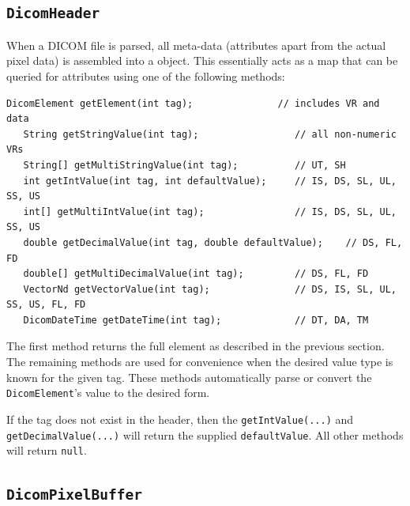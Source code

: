 \subsection{\texttt{DicomHeader}}

When a DICOM file is parsed, all meta-data (attributes apart from the actual pixel data) 
is assembled into a  object.  This essentially acts
as a map that can be queried for attributes using one of the following methods:
\begin{lstlisting}[]
   DicomElement getElement(int tag);               // includes VR and data
   String getStringValue(int tag);                 // all non-numeric VRs
   String[] getMultiStringValue(int tag);          // UT, SH
   int getIntValue(int tag, int defaultValue);     // IS, DS, SL, UL, SS, US
   int[] getMultiIntValue(int tag);                // IS, DS, SL, UL, SS, US
   double getDecimalValue(int tag, double defaultValue);    // DS, FL, FD
   double[] getMultiDecimalValue(int tag);         // DS, FL, FD
   VectorNd getVectorValue(int tag);               // DS, IS, SL, UL, SS, US, FL, FD
   DicomDateTime getDateTime(int tag);             // DT, DA, TM
\end{lstlisting}
The first method returns the full element as described in the previous section.  
The remaining methods are used for convenience when the desired value type is known for the given tag.  
These methods automatically parse or convert the \lstinline{DicomElement}'s value to the desired form.

If the tag does not exist in the header, then the \lstinline{getIntValue(...)} and
\lstinline{getDecimalValue(...)} will return the supplied \lstinline{defaultValue}.  All other methods
will return \lstinline{null}.

\subsection{\texttt{DicomPixelBuffer}}

